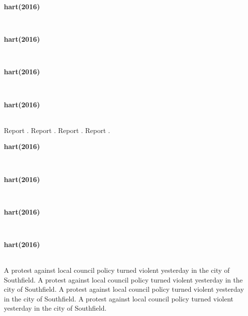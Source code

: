 \documentclass{book}
\newlength{\durchschuss}		%
\newcommand\marker[1][yellow]{\bgroup\markoverwith{\textcolor{#1}{\rule[-.5ex]{2pt}{2.5ex}}}\ULon}		%
\begin{document}
	\thispagestyle{empty}           %
	\setlength{\columnsep}{0.03\textwidth}		%


	\newpage
	\begin{paracol}{4}
		\noindent
		\centerline{\textbf{hart(2016)}}\\
		\switchcolumn
		\noindent
		\centerline{\textbf{hart(2016)}}\\
		\switchcolumn
		\noindent
		\centerline{\textbf{hart(2016)}}\\
		\switchcolumn
		\noindent
		\centerline{\textbf{hart(2016)}}\\
		\switchcolumn*
		\noindent
Report \marker[copy]{1}\footnotemarkA[1].		\switchcolumn
		\noindent
Report \marker[sub]{2}\footnotemarkA[1].		\switchcolumn
		\noindent
Report \marker[sub]{3}\footnotemarkA[1].		\switchcolumn
		\noindent
Report \marker[sub]{4}\footnotemarkA[1].		\switchcolumn
	\end{paracol}


	\newpage
	\begin{paracol}{4}
		\noindent
		\centerline{\textbf{hart(2016)}}\\
		\switchcolumn
		\noindent
		\centerline{\textbf{hart(2016)}}\\
		\switchcolumn
		\noindent
		\centerline{\textbf{hart(2016)}}\\
		\switchcolumn
		\noindent
		\centerline{\textbf{hart(2016)}}\\
		\switchcolumn*
		\noindent
A protest against local council policy turned violent yesterday in the city of Southfield.		\switchcolumn
		\noindent
A protest against local council policy turned violent yesterday in the city of Southfield.		\switchcolumn
		\noindent
A protest against local council policy turned violent yesterday in the city of Southfield.		\switchcolumn
		\noindent
A protest against local council policy turned violent yesterday in the city of Southfield.		\switchcolumn
	\end{paracol}
\end{document}
